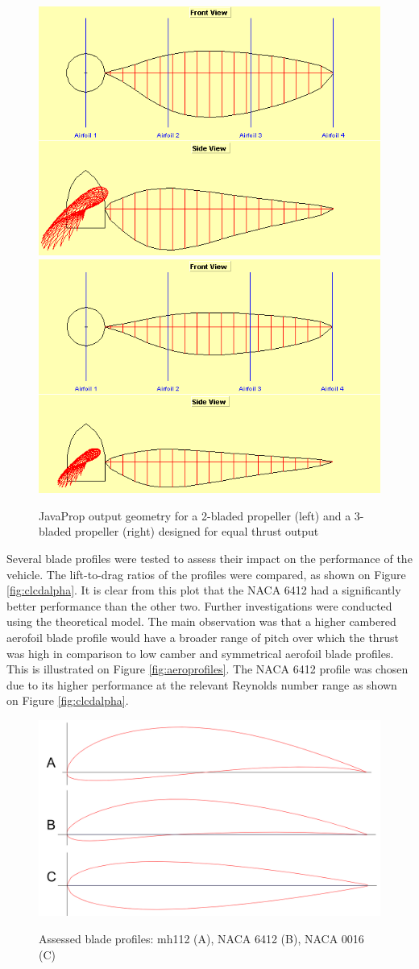 \begin{figure}[!htbp]
    \centering
    \includegraphics[width= 0.45\linewidth]{images/part6/javaprop2blades.png}
    \includegraphics[width= 0.48\linewidth]{images/part6/javaprop3blades.png}
    \caption{JavaProp output geometry for a 2-bladed propeller (left) and a 3-bladed propeller (right) designed for equal thrust output}
    \label{fig:jprop}
\end{figure}

Several blade profiles were tested to assess their impact on the performance of the vehicle. The lift-to-drag ratios of the profiles were compared, as shown on Figure \ref{fig:clcdalpha}. It is clear from this plot that the NACA 6412 had a significantly better performance than the other two. Further investigations were conducted using the theoretical model. The main observation was that a higher cambered aerofoil blade profile would have a broader range of pitch over which the thrust was high in comparison to low camber and symmetrical aerofoil blade profiles. This is illustrated on Figure \ref{fig:aeroprofiles}. The NACA 6412 profile was chosen due to its higher performance at the relevant Reynolds number range as shown on Figure \ref{fig:clcdalpha}.

\begin{figure}[!htbp]
    \centering
    \includegraphics[width=0.4\linewidth]{images/part6/bladeprofiles.png}
    \label{fig:bladeprofiles}
    \caption{Assessed blade profiles: mh112 (A), NACA 6412 (B), NACA 0016 (C)}
\end{figure}

